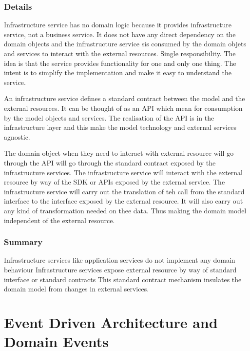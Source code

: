 \documentclass[a4paper, 11pt]{book}
\begin{document}
    \subsection{Details}
    Infrastructure service has no domain logic because it provides infrastructure service, not a business service.
    It does not have any direct dependency on the domain objects and the infrastructure service sis consumed by the domain objets and services to interact with the external resources.
    Single responsibility.
    The idea is that the service provides functionality for one and only one thing.
    The intent is to simplify the implementation and make it easy to understand the service.

    An infrastructure service defines a standard contract between the model and the external resources.
    It can be thought of as an API which mean for consumption by the model objects and services.
    The realisation of the API is in the infrastructure layer and this make the model technology and external services agnostic.

    The domain object when they need to interact with external resource will go through the API will go through the standard contract exposed by the infrastructure services.
    The infrastructure service will interact with the external resource by way of the SDK or APIs exposed by the external service.
    The infrastructure service will carry out the translation of teh call from the standard interface to the interface exposed by the external resource.
    It will also carry out any kind of transformation needed on thee data.
    Thus making the domain model independent of the external resource.

    \subsection{Summary}
    Infrastructure services like application services do not implement any domain behaviour
    Infrastructure services expose external resource by way of standard interface or standard contracts
    This standard contract mechanism insulates the domain model from changes in external services.


    \chapter{Event Driven Architecture and Domain Events}
\end{document}
